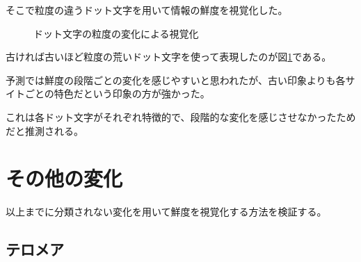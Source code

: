 そこで粒度の違うドット文字を用いて情報の鮮度を視覚化した。

\begin{figure}[htbp]
  \begin{center}
  \end{center}
  \caption{ドット文字の粒度の変化による視覚化}
  \label{fig:ver-dot}
\end{figure}

古ければ古いほど粒度の荒いドット文字を使って表現したのが図\ref{fig:ver-dot}である。

予測では鮮度の段階ごとの変化を感じやすいと思われたが、古い印象よりも各サイトごとの特色だという印象の方が強かった。

これは各ドット文字がそれぞれ特徴的で、段階的な変化を感じさせなかったためだと推測される。

\section{その他の変化}
\label{sec:ver-other}

以上までに分類されない変化を用いて鮮度を視覚化する方法を検証する。

\subsection{テロメア}
\label{subsec:ver-oth-tlm}


